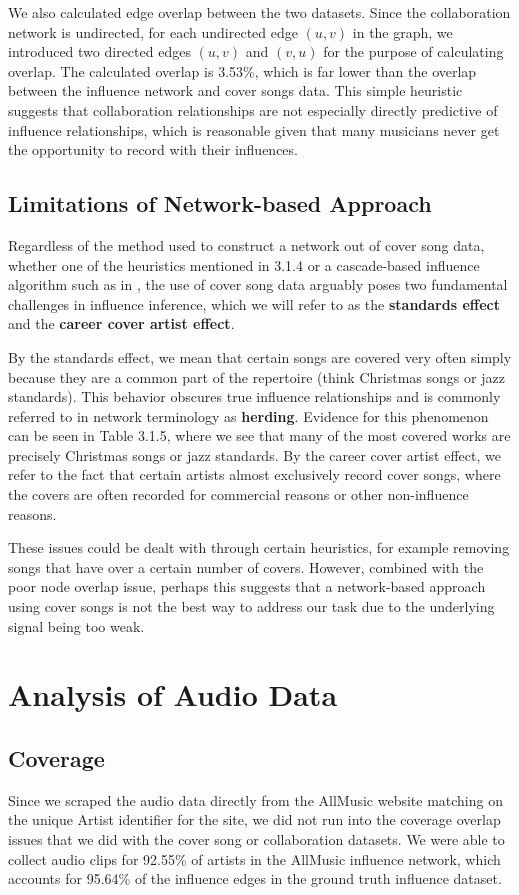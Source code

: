 We also calculated edge overlap between the two datasets. Since the collaboration network is undirected, for each undirected edge $(u,v)$ in the graph, we introduced two directed edges $(u,v)$ and $(v,u)$ for the purpose of calculating overlap. The calculated overlap is 3.53\%, which is far lower than the overlap between the influence network and cover songs data. This simple heuristic suggests that collaboration relationships are not especially directly predictive of influence relationships, which is reasonable given that many musicians never get the opportunity to record with their influences.

\subsection{Limitations of Network-based Approach}
Regardless of the method used to construct a network out of cover song data, whether one of the heuristics mentioned in 3.1.4 or a cascade-based influence algorithm such as in \cite{gomez2010inferring}, the use of cover song data arguably poses two fundamental challenges in influence inference, which we will refer to as the \textbf{standards effect} and the \textbf{career cover artist effect}.

By the standards effect, we mean that certain songs are covered very often simply because they are a common part of the repertoire (think Christmas songs or jazz standards). This behavior obscures true influence relationships and is commonly referred to in network terminology as \textbf{herding}. Evidence for this phenomenon can be seen in Table 3.1.5, where we see that many of the most covered works are precisely Christmas songs or jazz standards. By the career cover artist effect, we refer to the fact that certain artists almost exclusively record cover songs, where the covers are often recorded for commercial reasons or other non-influence reasons.

These issues could be dealt with through certain heuristics, for example removing songs that have over a certain number of covers. However, combined with the poor node overlap issue, perhaps this suggests that a network-based approach using cover songs is not the best way to address our task due to the underlying signal being too weak.

\section{Analysis of Audio Data}
\subsection{Coverage}
Since we scraped the audio data directly from the AllMusic website matching on the unique Artist identifier for the site, we did not run into the coverage overlap issues that we did with the cover song or collaboration datasets. We were able to collect audio clips for 92.55\% of artists in the AllMusic influence network, which accounts for 95.64\% of the influence edges in the ground truth influence dataset. 

